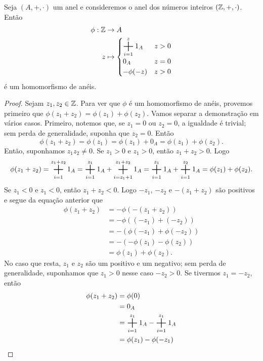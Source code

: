 \begin{ex}
	Seja $(A,+,\cdot)$ um anel e consideremos o anel dos números inteiros $(\mathbb{Z},+,\cdot)$. Então
	\begin{align*}
	\phi: \Z &\to A \\
		z &\mapsto \begin{cases}
					\displaystyle \bigsum_{i=1}^z 1_A & z>0 \\
					0_A & z=0 \\
					-\phi(-z) & z>0
					\end{cases}
	\end{align*}
é um homomorfismo de anéis.
\end{ex}
\begin{proof}
	Sejam $z_1,z_2 \in \mathbb{Z}$. Para ver que $\phi$ é um homomorfismo de anéis, provemos primeiro que $\phi(z_1+z_2)=\phi(z_1)+\phi(z_2)$. Vamos separar a demonstração em vários casos. Primeiro, notemos que, se $z_1=0$ ou $z_2=0$, a igualdade é trivial; sem perda de generalidade, suponha que $z_2=0$. Então
	\begin{equation*}
	\phi(z_1+z_2) = \phi(z_1) = \phi(z_1) + 0_A = \phi(z_1) + \phi(z_2).
	\end{equation*}
Então, suponhamos $z_1z_2 \neq 0$. Se $z_1>0$ e $z_1>0$, então $z_1+z_2>0$. Logo
	\begin{equation*}
	\phi(z_1+z_2) = \bigsum_{i=1}^{z_1+z_2} 1_A = \bigsum_{i=1}^{z_1} 1_A + \bigsum_{i=z_1+1}^{z_1+z_2} 1_A = \bigsum_{i=1}^{z_1} 1_A + \bigsum_{i=1}^{z_2} 1_A = \phi(z_1)+\phi(z_2).
	\end{equation*}
Se $z_1<0$ e $z_1<0$, então $z_1+z_2<0$. Logo $-z_1$, $-z_2$ e $-(z_1+z_2)$ são positivos e segue da equação anterior que
	\begin{align*}
	\phi(z_1+z_2) &= -\phi(-(z_1+z_2)) \\
		&= -\phi((-z_1)+(-z_2)) \\
		&= -(\phi(-z_1)+\phi(-z_2)) \\
		&= -(-\phi(z_1)-\phi(z_2)) \\
		&= \phi(z_1)+\phi(z_2).
	\end{align*}
No caso que resta, $z_1$ e $z_2$ são um positivo e um negativo; sem perda de generalidade, suponhamos que $z_1>0$ nesse caso $-z_2>0$. Se tivermos $z_1=-z_2$, então
	\begin{align*}
	\phi(z_1+z_2) &= \phi(0) \\
		&= 0_A \\
		&= \bigsum_{i=1}^{z_1} 1_A - \bigsum_{i=1}^{z_1} 1_A \\
		&= \phi(z_1)-\phi(-z_1) \\

\end{align*}
\end{proof}
